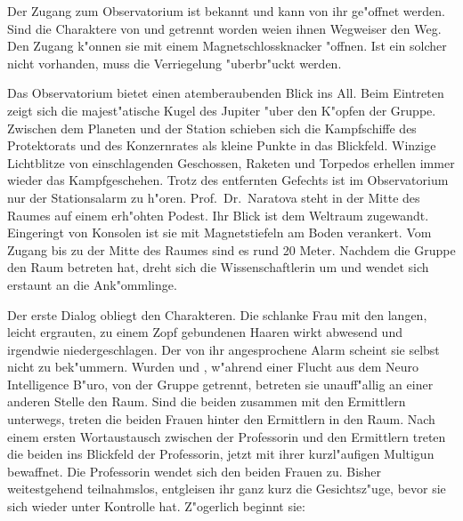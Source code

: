 
Der Zugang zum Observatorium ist \ml{} bekannt und kann von ihr ge"offnet werden. Sind die Charaktere von \xl{} und \ml{} getrennt worden wei\3en ihnen Wegweiser den Weg. Den Zugang k"onnen sie mit einem Magnetschlossknacker "offnen. Ist ein solcher nicht vorhanden, muss die Verriegelung "uberbr"uckt werden.

Das Observatorium bietet einen atemberaubenden Blick ins All. Beim Eintreten zeigt sich die majest"atische Kugel des Jupiter "uber den K"opfen der Gruppe. Zwischen dem Planeten und der Station schieben sich die Kampfschiffe des Protektorats und des Konzernrates als kleine Punkte in das Blickfeld. Winzige Lichtblitze von einschlagenden Geschossen, Raketen und Torpedos erhellen immer wieder das Kampfgeschehen. Trotz des entfernten Gefechts ist im Observatorium nur der Stationsalarm zu h"oren. Prof.~Dr.~Naratova steht in der Mitte des Raumes auf einem erh"ohten Podest. Ihr Blick ist dem Weltraum zugewandt. Eingeringt von Konsolen ist sie mit Magnetstiefeln am Boden verankert. Vom Zugang bis zu der Mitte des Raumes sind es rund 20 Meter. Nachdem die Gruppe den Raum betreten hat, dreht sich die Wissenschaftlerin um und wendet sich erstaunt an die Ank"ommlinge.


Der erste Dialog obliegt den Charakteren. Die schlanke Frau mit den langen, leicht ergrauten, zu einem Zopf gebundenen Haaren wirkt abwesend und irgendwie niedergeschlagen. Der von ihr angesprochene Alarm scheint sie selbst nicht zu bek"ummern. Wurden \xl{} und \ml{}, w"ahrend einer Flucht aus dem Neuro Intelligence B"uro, von der Gruppe getrennt, betreten sie unauff"allig an einer anderen Stelle den Raum. Sind die beiden zusammen mit den Ermittlern unterwegs, treten die beiden Frauen hinter den Ermittlern in den Raum. Nach einem ersten Wortaustausch zwischen der Professorin und den Ermittlern treten die beiden ins Blickfeld der Professorin, \xl{} jetzt mit ihrer kurzl"aufigen Multigun bewaffnet. Die Professorin wendet sich den beiden Frauen zu. Bisher weitestgehend teilnahmslos, entgleisen ihr ganz kurz die Gesichtsz"uge, bevor sie sich wieder unter Kontrolle hat. Z"ogerlich beginnt sie:


